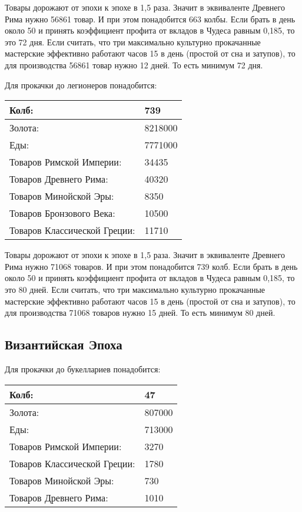 Товары дорожают от эпохи к эпохе в 1,5 раза.
Значит в эквиваленте Древнего Рима нужно 56861 товар.
И при этом понадобится 663 колбы. Если брать в день около 50 и принять коэффициент профита от вкладов
в Чудеса равным 0,185, то это 72 дня.
Если считать, что три максимально культурно прокачанные мастерские эффективно работают часов 15 в день (простой от сна и затупов),
то для производства 56861 товар нужно 12 дней.
То есть минимум 72 дня.


Для прокачки до легионеров понадобится:

\begin{center}
    \begin{tabular}[h!]{|l|l|}
        \hline
        Колб:   & 739 \\\hline
        Золота: & 8218000 \\\hline
        Еды:    & 7771000 \\\hline
        Товаров Римской Империи: & 34435 \\\hline
        Товаров Древнего Рима: & 40320 \\\hline
        Товаров Минойской Эры: & 8350 \\\hline
        Товаров Бронзового Века: & 10500 \\\hline
        Товаров Классической Греции: & 11710 \\\hline
    \end{tabular}
\end{center}

Товары дорожают от эпохи к эпохе в 1,5 раза.
Значит в эквиваленте Древнего Рима нужно 71068 товаров.
И при этом понадобится 739 колб. Если брать в день около 50 и принять коэффициент профита от вкладов
в Чудеса равным 0,185, то это 80 дней.
Если считать, что три максимально культурно прокачанные мастерские эффективно работают часов 15 в день (простой от сна и затупов),
то для производства 71068 товаров нужно 15 дней.
То есть минимум 80 дней.



\subsection{Византийская Эпоха}

Для прокачки до букеллариев понадобится:

\begin{center}
    \begin{tabular}[h!]{|l|l|}
        \hline
        Колб:   & 47 \\\hline
        Золота: & 807000 \\\hline
        Еды:    & 713000 \\\hline
        Товаров Римской Империи: & 3270 \\\hline
        Товаров Классической Греции: & 1780 \\\hline
        Товаров Минойской Эры: & 730 \\\hline
        Товаров Древнего Рима: & 1010 \\\hline
    \end{tabular}
\end{center}

